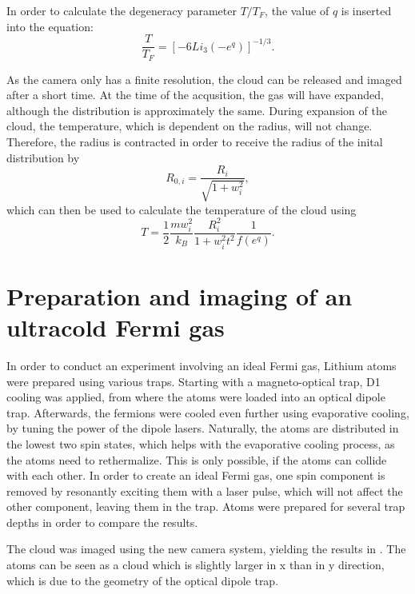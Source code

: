 In order to calculate the degeneracy parameter $T/T_F$, the value of $q$ is inserted into the equation:
\begin{equation}
\label{eq:tovertf}
\frac{T}{T_F} = \left[ -6 Li_3(-e^q) \right]^{-1/3}.
\end{equation}

As the camera only has a finite resolution, the cloud can be released and imaged after a short time. At the time of the acqusition, the gas will have expanded, although the distribution is approximately the same. During expansion of the cloud, the temperature, which is dependent on the radius, will not change. Therefore, the radius is contracted in order to receive the radius of the inital distribution by
\begin{equation}
R_{0,i} = \frac{R_{i}}{\sqrt{1+ w_i^2}},
\end{equation}
which can then be used to calculate the temperature of the cloud using
\begin{equation}
\label{eq:temp}
T = \frac{1}{2} \frac{mw_i^2}{k_B} \frac{R_i^2}{1+w_i^2t^2}\frac{1}{f(e^q)}.
\end{equation}


	
\section{Preparation and imaging of an ultracold Fermi gas}
\label{sec:fermiexperiment}

In order to conduct an experiment involving an ideal Fermi gas, Lithium atoms were prepared using various traps. Starting with a magneto-optical trap, D1 cooling was applied, from where the atoms were loaded into an optical dipole trap. Afterwards, the fermions were cooled even further using evaporative cooling, by tuning the power of the dipole lasers. Naturally, the atoms are distributed in the lowest two spin states, which helps with the evaporative cooling process, as the atoms need to rethermalize. This is only possible, if the atoms can collide with each other. In order to create an ideal Fermi gas, one spin component is removed by resonantly exciting them with a laser pulse, which will not affect the other component, leaving them in the trap. Atoms were prepared for several trap depths in order to compare the results.

The cloud was imaged using the new camera system, yielding the results in . The atoms can be seen as a cloud which is slightly larger in x than in y direction, which is due to the geometry of the optical dipole trap.

